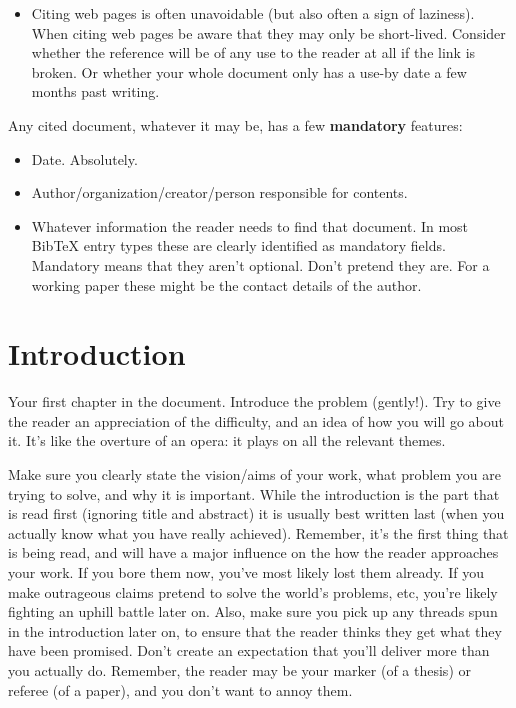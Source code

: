 \documentclass[a4paper,twoside, openright,12pt]{report}
\begin{document}
\begin{itemize}
\item Citing web pages is often unavoidable (but also often a sign of laziness). When citing web pages be aware that they may only be short-lived. Consider whether the reference will be of any use to the reader at all if the link is broken. Or whether your whole document only has a use-by date a few months past writing.

\end{itemize}

Any cited document, whatever it may be, has a few \textbf{mandatory} features:
\begin{itemize}
	\item Date. Absolutely. 
	\item Author/organization/creator/person responsible for contents.
	\item Whatever information the reader needs to find that document. In most BibTeX entry types these are clearly identified as mandatory fields. Mandatory means that they aren't optional. Don't pretend they are. For a working paper these might be the contact details of the author.
\end{itemize}





\chapter{Introduction}

Your first chapter in the document.
Introduce the problem (gently!). Try to give the reader an appreciation of the difficulty, and an idea of how you will go about it. It's like the overture of an opera: it plays on all the relevant themes.

Make sure you clearly state the vision/aims of your work, what problem you are trying to solve, and why it is important. While the introduction is the part that is read first (ignoring title and abstract) it is usually best written last (when you actually know what you have really achieved). Remember, it's the first thing that is being read, and will have a major influence on the how the reader approaches your work. If you bore them now, you've most likely lost them already. If you make outrageous claims pretend to solve the world's problems, etc, you're likely fighting an uphill battle later on. Also, make sure you pick up any threads spun in the introduction later on, to ensure that the reader thinks they get what they have been promised. Don't create an expectation that you'll deliver more than you actually do. Remember, the reader may be your marker (of a thesis) or referee (of a paper), and you don't want to annoy them.
\end{document}
